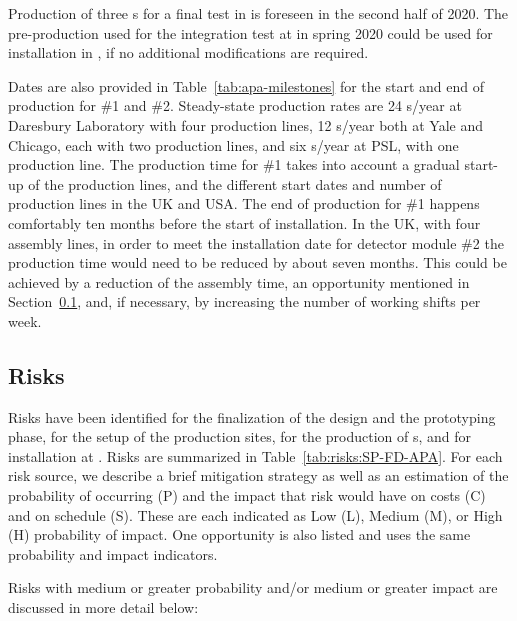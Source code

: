 Production of three s for a final test in  is foreseen in the second half of 2020. The pre-production  used for the integration test at  in spring 2020 could be used for installation in , if no additional modifications are required.

Dates are also provided in Table~\ref{tab:apa-milestones} for the start and end of  production for  \#1 and \#2. Steady-state production rates are 24 s/year at Daresbury Laboratory with four production lines, 12 s/year both at Yale and Chicago, each with two production lines, and six s/year at PSL, with one production line. The production time for  \#1 takes into account a gradual start-up of the production lines, and the different start dates and number of production lines in the UK and USA. The end of  production for  \#1 happens comfortably ten months before the start of installation. In the UK, with four assembly lines, in order to meet the installation date for detector module \#2 the  production time would need to be reduced by about seven months. This could be achieved by a reduction of the  assembly time, an opportunity mentioned in Section~\ref{sec:fdsp-apa-cost-sched-risks}, and, if necessary, by increasing the number of working shifts per week.
%

\subsection{Risks}
\label{sec:fdsp-apa-cost-sched-risks}

Risks have been identified for the finalization of the  design and the prototyping phase, for the setup of the production sites, for the production of s, and for installation at .  Risks are summarized in Table~\ref{tab:risks:SP-FD-APA}.  For each risk source, we describe a brief mitigation strategy as well as an estimation of the probability of occurring (P) and the impact that risk would have on costs (C) and on schedule (S).  These are each indicated as Low (L), Medium (M), or High (H) probability of impact. One opportunity is also listed and uses the same probability and impact indicators.



Risks with medium or greater probability and/or medium or greater impact are discussed in more detail below:

